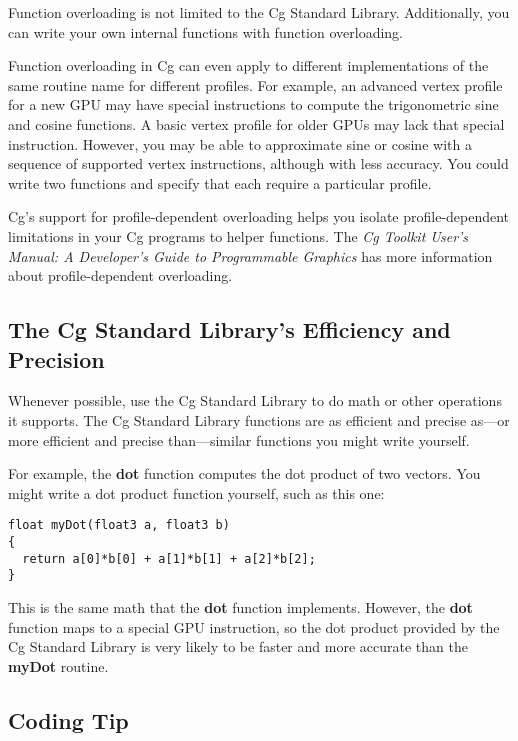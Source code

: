 \documentclass[../main.tex]{subfiles}
\begin{document}
Function overloading is not limited to the Cg Standard Library. Additionally, you can write your own internal functions with function overloading.

Function overloading in Cg can even apply to different implementations of the same routine name for different profiles. For example, an advanced vertex profile for a new GPU may have special instructions to compute the trigonometric sine and cosine functions. A basic vertex profile for older GPUs may lack that special instruction. However, you may be able to approximate sine or cosine with a sequence of supported vertex instructions, although with less accuracy. You could write two functions and specify that each require a particular profile.

Cg's support for profile-dependent overloading helps you isolate profile-dependent limitations in your Cg programs to helper functions. The \textit{Cg Toolkit User's Manual: A Developer's Guide to Programmable Graphics} has more information about profile-dependent overloading.

\subsection*{The Cg Standard Library's Efficiency and Precision}

Whenever possible, use the Cg Standard Library to do math or other operations it supports. The Cg Standard Library functions are as efficient and precise as—or more efficient and precise than—similar functions you might write yourself.

For example, the \textbf{dot} function computes the dot product of two vectors. You might write a dot product function yourself, such as this one:

\FloatBarrier
\begin{lstlisting}
float myDot(float3 a, float3 b)
{
  return a[0]*b[0] + a[1]*b[1] + a[2]*b[2];
}
\end{lstlisting}
\FloatBarrier

This is the same math that the \textbf{dot} function implements. However, the \textbf{dot} function maps to a special GPU instruction, so the dot product provided by the Cg Standard Library is very likely to be faster and more accurate than the \textbf{myDot} routine.

\subsection*{Coding Tip}
\end{document}
